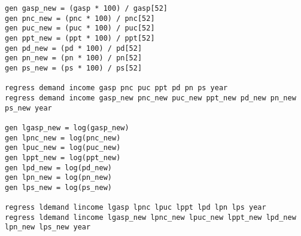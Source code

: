 \documentclass{article}
\begin{document}
\begin{verbatim}
gen gasp_new = (gasp * 100) / gasp[52]
gen pnc_new = (pnc * 100) / pnc[52]
gen puc_new = (puc * 100) / puc[52]
gen ppt_new = (ppt * 100) / ppt[52]
gen pd_new = (pd * 100) / pd[52]
gen pn_new = (pn * 100) / pn[52]
gen ps_new = (ps * 100) / ps[52]

regress demand income gasp pnc puc ppt pd pn ps year
regress demand income gasp_new pnc_new puc_new ppt_new pd_new pn_new ps_new year

gen lgasp_new = log(gasp_new)
gen lpnc_new = log(pnc_new)
gen lpuc_new = log(puc_new)
gen lppt_new = log(ppt_new)
gen lpd_new = log(pd_new)
gen lpn_new = log(pn_new)
gen lps_new = log(ps_new)

regress ldemand lincome lgasp lpnc lpuc lppt lpd lpn lps year
regress ldemand lincome lgasp_new lpnc_new lpuc_new lppt_new lpd_new lpn_new lps_new year

\end{verbatim}
\end{document}

